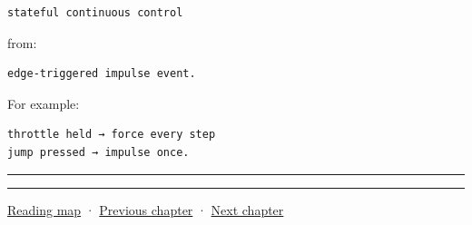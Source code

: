 \begin{verbatim}
stateful continuous control
\end{verbatim}

from:

\begin{verbatim}
edge-triggered impulse event.
\end{verbatim}

For example:

\begin{verbatim}
throttle held → force every step
jump pressed → impulse once.
\end{verbatim}

\begin{center}\rule{0.5\linewidth}{0.5pt}\end{center}

\begin{center}\rule{0.5\linewidth}{0.5pt}\end{center}

\hyperref[volume-reading-map]{Reading map} · \hyperref[06-engine-ii-ch036-auditing-capsule-mass-properties-and-collision-formulas]{Previous chapter} · \hyperref[06-engine-ii-ch038-integrator-choices-and-energy-drift]{Next chapter}
